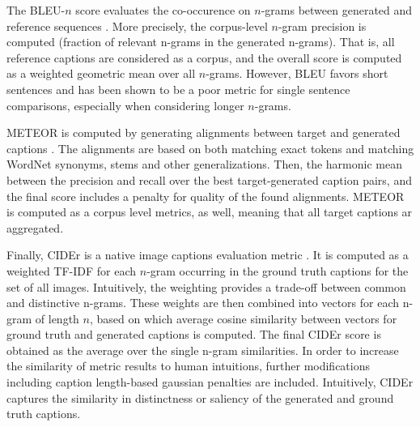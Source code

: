 The BLEU-$n$ score evaluates the co-occurence on $n$-grams between generated and reference sequences \parencite{papineni2002bleu}. More precisely, the corpus-level $n$-gram precision is computed (fraction of relevant n-grams in the generated n-grams). That is, all reference captions are considered as a corpus, and the overall score is computed as a weighted geometric mean over all $n$-grams. However, BLEU favors short sentences and has been shown to be a poor metric for single sentence comparisons, especially when considering longer $n$-grams.


METEOR is computed by generating alignments between target and generated captions \parencite{banerjee2005meteor}. The alignments are based on both matching exact tokens and matching WordNet synonyms, stems and other generalizations. Then, the harmonic mean between the precision and recall over the best target-generated caption pairs, and the final score includes a penalty for quality of the found alignments. METEOR is computed as a corpus level metrics, as well, meaning that all target captions ar aggregated.
 
Finally, CIDEr is a native image captions evaluation metric \parencite{vedantam2015cider}. It is computed as a weighted TF-IDF for each $n$-gram occurring in the ground truth captions for the set of all images. Intuitively, the weighting provides a trade-off between common and distinctive n-grams. These weights are then combined into vectors for each n-gram of length $n$, based on which average cosine similarity between vectors for ground truth and generated captions is computed. The final CIDEr score is obtained as the average over the single n-gram similarities. In order to increase the similarity of metric results to human intuitions, further modifications including caption length-based gaussian penalties are included. Intuitively, CIDEr captures the similarity in distinctness or saliency of the generated and ground truth captions.

